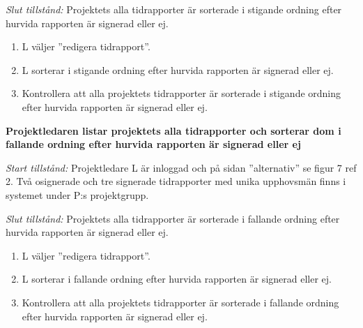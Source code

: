 \documentclass[a4paper]{article}
\begin{document}
\begin{FT}
\emph{Slut tillstånd:} Projektets alla tidrapporter är sorterade i stigande ordning efter hurvida rapporten är signerad eller ej.

\begin{enumerate}
\item L väljer ''redigera tidrapport''.
\item L sorterar i stigande ordning efter hurvida rapporten är signerad eller ej.
\item Kontrollera att alla projektets tidrapporter är sorterade i stigande ordning efter hurvida rapporten är signerad eller ej.
\end{enumerate}

\item %
\textbf{Projektledaren listar projektets alla tidrapporter och sorterar dom i fallande ordning efter hurvida rapporten är signerad eller ej}

\emph{Start tillstånd:} Projektledare L är inloggad och på sidan ''alternativ'' se figur 7 ref 2. Två osignerade och tre signerade tidrapporter med unika upphovsmän finns i systemet under P:s projektgrupp.

\emph{Slut tillstånd:} Projektets alla tidrapporter är sorterade i fallande ordning efter hurvida rapporten är signerad eller ej.

\begin{enumerate}
\item L väljer ''redigera tidrapport''.
\item L sorterar i fallande ordning efter hurvida rapporten är signerad eller ej.
\item Kontrollera att alla projektets tidrapporter är sorterade i fallande ordning efter hurvida rapporten är signerad eller ej.
\end{enumerate}

\end{FT}
\end{document}
